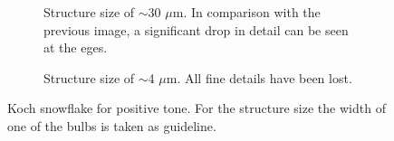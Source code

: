 \begin{figure}[htb]
\begin{subfigure}[t]{0.32\linewidth}
  	\caption{Structure size of $\sim$30 $\mu$m. In comparison with the previous image, a significant drop in detail can be seen at the eges.}
  	\label{fig:b2d20_q20}
  \end{subfigure}
\hfill
     \begin{subfigure}[t]{0.32\linewidth}
  	\caption{Structure size of $\sim$4 $\mu$m. All fine details have been lost.}
  	\label{fig:b2d21_q21}
  \end{subfigure}
\caption{Koch snowflake for positive tone. For the structure size the width of one of the bulbs is taken as guideline.}
 \end{figure}









